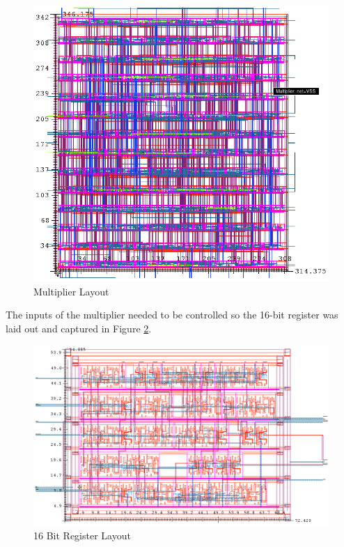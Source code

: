\documentclass[11pt]{article}
\begin{document}
		\begin{figure}[H] 
			\centering 
			\includegraphics[width=\textwidth,height=\dimexpr\textheight-4\baselineskip-\abovecaptionskip-\belowcaptionskip\relax,keepaspectratio]{"Pictures/Multiplier Layout"}
			\caption{Multiplier Layout} 
			\label{fig:Multiplier-Layout} 
		\end{figure}
	
		The inputs of the multiplier needed to be controlled so the 16-bit register was laid out and captured in Figure \ref{fig:nBitRegister-16-Bit-Layout}.
		
		\begin{figure}[H] 
			\centering 
			\includegraphics[width=\textwidth,height=\dimexpr\textheight-4\baselineskip-\abovecaptionskip-\belowcaptionskip\relax,keepaspectratio]{"Pictures/nBitRegister 16-Bit Layout"}
			\caption{16 Bit Register Layout} 
			\label{fig:nBitRegister-16-Bit-Layout} 
		\end{figure}
	
\end{document}
